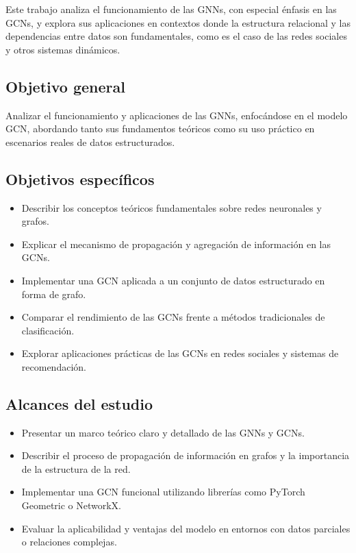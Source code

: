 \documentclass[11pt]{article} %
\begin{document}
Este trabajo analiza el funcionamiento de las GNNs, con especial énfasis en las GCNs, y explora sus aplicaciones en contextos donde la estructura relacional y las dependencias entre datos son fundamentales, como es el caso de las redes sociales y otros sistemas dinámicos.

\vspace{5pt}
\subsection{Objetivo general}
\vspace{1pt}
Analizar el funcionamiento y aplicaciones de las GNNs, enfocándose en el modelo GCN, abordando tanto sus fundamentos teóricos como su uso práctico en escenarios reales de datos estructurados.

\vspace{5pt}
\subsection{Objetivos específicos}
\vspace{-3pt}
\begin{itemize}\setlength\itemsep{0pt}
    \item Describir los conceptos teóricos fundamentales sobre redes neuronales y grafos.
    \item Explicar el mecanismo de propagación y agregación de información en las GCNs.
    \item Implementar una GCN aplicada a un conjunto de datos estructurado en forma de grafo.
    \item Comparar el rendimiento de las GCNs frente a métodos tradicionales de clasificación.
    \item Explorar aplicaciones prácticas de las GCNs en redes sociales y sistemas de recomendación.
\end{itemize}

\vspace{5pt}
\subsection{Alcances del estudio}
\vspace{-3pt}
\begin{itemize}\setlength\itemsep{0pt}
    \item Presentar un marco teórico claro y detallado de las GNNs y GCNs.
    \item Describir el proceso de propagación de información en grafos y la importancia de la estructura de la red.
    \item Implementar una GCN funcional utilizando librerías como PyTorch Geometric o NetworkX.
    \item Evaluar la aplicabilidad y ventajas del modelo en entornos con datos parciales o relaciones complejas.
\end{itemize}
\end{document}
